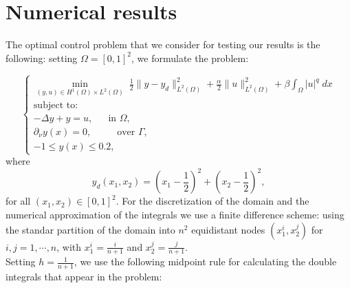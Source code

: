 \documentclass[11pt,a4paper]{amsart}
\newcommand{\om}{\Omega}
\newcommand{\norm}[1]{\lVert #1 \rVert}
\begin{document}
\section{Numerical results}

The optimal control problem that we consider for testing our results is the following: setting $\om=[0,1]^2$, we formulate the problem:

\begin{equation}
    \begin{cases}
    \displaystyle\min_{(y,u)\in H^1(\om)\times L^2(\om)}\; \frac{1}{2}\norm{y-y_d}^2_{L^2(\om)}+\frac{\alpha}{2}\norm{u}^2_{L^2(\om)}+\beta \int_{\om} |u|^{q}\; dx\\
    \mbox{subject to:}\\
    -\Delta y+y=u, \phantom{aaa} \mbox{in } \om,\\
    \partial_{\nu}y(x)=0, \phantom{aaaaa} \mbox{over } \Gamma,\\    
    -1\le y(x)\le 0.2 ,
    \end{cases}
\end{equation}
where 
\[
    y_d(x_1,x_2)=\left(x_1-\frac{1}{2}\right)^2+\left(x_2-\frac{1}{2}\right)^2,
\]
for all $(x_1,x_2)\in [0,1]^2$. For the discretization of the domain and the numerical approximation of the integrals we use a finite difference scheme: using the standar partition of the domain into $n^2$ equidistant nodes $(x_1^i,x_2^j)$ for $i,j=1,\cdots,n$, with $x_1^i=\frac{i}{n+1}$ and $x_2^j=\frac{j}{n+1}$.\\

Setting $h=\frac{1}{n+1}$, we use the following midpoint rule for calculating the double integrals that appear in the problem:
\end{document}
